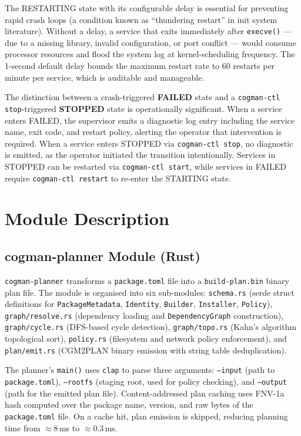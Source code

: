 \documentclass[12pt,a4paper]{report}
\begin{document}
The RESTARTING state with its configurable delay is essential for preventing rapid
crash loops (a condition known as ``thundering restart'' in init system literature).
Without a delay, a service that exits immediately after \texttt{execve()} --- due
to a missing library, invalid configuration, or port conflict --- would consume
processor resources and flood the system log at kernel-scheduling frequency.
The 1-second default delay bounds the maximum restart rate to 60 restarts per
minute per service, which is auditable and manageable.

The distinction between a crash-triggered \textbf{FAILED} state and a
\texttt{cogman-ctl stop}-triggered \textbf{STOPPED} state is operationally
significant. When a service enters FAILED, the supervisor emits a diagnostic log
entry including the service name, exit code, and restart policy, alerting the
operator that intervention is required. When a service enters STOPPED via
\texttt{cogman-ctl stop}, no diagnostic is emitted, as the operator initiated the
transition intentionally. Services in STOPPED can be restarted via
\texttt{cogman-ctl start}, while services in FAILED require \texttt{cogman-ctl
restart} to re-enter the STARTING state.

\chapter{Module Description}

\section{cogman-planner Module (Rust)}

\texttt{cogman-planner} transforms a \texttt{package.toml} file into a
\texttt{build-plan.bin} binary plan file. The module is organised into six
sub-modules: \texttt{schema.rs} (serde struct definitions for
\texttt{PackageMetadata}, \texttt{Identity}, \texttt{Builder}, \texttt{Installer},
\texttt{Policy}), \texttt{graph/resolve.rs} (dependency loading and
\texttt{DependencyGraph} construction), \texttt{graph/cycle.rs} (DFS-based cycle
detection), \texttt{graph/topo.rs} (Kahn's algorithm topological sort),
\texttt{policy.rs} (filesystem and network policy enforcement), and
\texttt{plan/emit.rs} (CGM2PLAN binary emission with string table deduplication).

The planner's \texttt{main()} uses \texttt{clap} to parse three arguments:
\texttt{--input} (path to \texttt{package.toml}), \texttt{--rootfs} (staging
root, used for policy checking), and \texttt{--output} (path for the emitted plan
file). Content-addressed plan caching uses FNV-1a hash computed over the package
name, version, and raw bytes of the \texttt{package.toml} file. On a cache hit,
plan emission is skipped, reducing planning time from $\approx$8\,ms to
$\approx$0.3\,ms.
\end{document}
